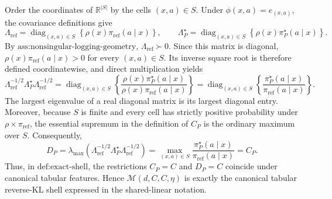 Order the coordinates of \(\mathbb R^{|S|}\) by the cells \((x,a)\in S\). Under \(\phi(x,a)=e_{(x,a)}\), the covariance definitions give
\[
\Lambda_{\mathrm{ref}}
=\operatorname{diag}_{(x,a)\in S}\!\left\{\rho(x)\pi_{\mathrm{ref}}(a\mid x)\right\},
\qquad
\Lambda_P^\star
=\operatorname{diag}_{(x,a)\in S}\!\left\{\rho(x)\pi_P^\star(a\mid x)\right\}.
\]
By \(\text{ass:nonsingular-logging-geometry}\), \(\Lambda_{\mathrm{ref}}\succ0\). Since this matrix is diagonal, \(\rho(x)\pi_{\mathrm{ref}}(a\mid x)>0\) for every \((x,a)\in S\). Its inverse square root is therefore defined coordinatewise, and direct multiplication yields
\[
\Lambda_{\mathrm{ref}}^{-1/2}\Lambda_P^\star\Lambda_{\mathrm{ref}}^{-1/2}
=\operatorname{diag}_{(x,a)\in S}\!\left\{
\frac{\rho(x)\pi_P^\star(a\mid x)}{\rho(x)\pi_{\mathrm{ref}}(a\mid x)}
\right\}
=\operatorname{diag}_{(x,a)\in S}\!\left\{
\frac{\pi_P^\star(a\mid x)}{\pi_{\mathrm{ref}}(a\mid x)}
\right\}.
\]
The largest eigenvalue of a real diagonal matrix is its largest diagonal entry. Moreover, because \(S\) is finite and every cell has strictly positive probability under \(\rho\times\pi_{\mathrm{ref}}\), the essential supremum in the definition of \(C_P\) is the ordinary maximum over \(S\). Consequently,
\[
D_P
=\lambda_{\max}\!\left(\Lambda_{\mathrm{ref}}^{-1/2}\Lambda_P^\star\Lambda_{\mathrm{ref}}^{-1/2}\right)
=\max_{(x,a)\in S}\frac{\pi_P^\star(a\mid x)}{\pi_{\mathrm{ref}}(a\mid x)}
=C_P.
\]
Thus, in \(\text{def:exact-shell}\), the restrictions \(C_P=C\) and \(D_P=C\) coincide under canonical tabular features. Hence \(\mathcal M(d,C,C,\eta)\) is exactly the canonical tabular reverse-KL shell expressed in the shared-linear notation.